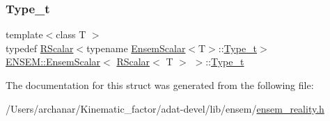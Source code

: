 \subsubsection{\texorpdfstring{Type\_t}{Type\_t}\hspace{0.1cm}{\footnotesize\ttfamily [3/3]}}
{\footnotesize\ttfamily template$<$class T $>$ \\
typedef \mbox{\hyperlink{classENSEM_1_1RScalar}{R\+Scalar}}$<$typename \mbox{\hyperlink{structENSEM_1_1EnsemScalar}{Ensem\+Scalar}}$<$T$>$\+::\mbox{\hyperlink{structENSEM_1_1EnsemScalar_3_01RScalar_3_01T_01_4_01_4_a153cd6d2b242e40d3614a2801d091aad}{Type\+\_\+t}}$>$ \mbox{\hyperlink{structENSEM_1_1EnsemScalar}{E\+N\+S\+E\+M\+::\+Ensem\+Scalar}}$<$ \mbox{\hyperlink{classENSEM_1_1RScalar}{R\+Scalar}}$<$ T $>$ $>$\+::\mbox{\hyperlink{structENSEM_1_1EnsemScalar_3_01RScalar_3_01T_01_4_01_4_a153cd6d2b242e40d3614a2801d091aad}{Type\+\_\+t}}}



The documentation for this struct was generated from the following file\+:\begin{DoxyCompactItemize}
\item 
/\+Users/archanar/\+Kinematic\+\_\+factor/adat-\/devel/lib/ensem/\mbox{\hyperlink{adat-devel_2lib_2ensem_2ensem__reality_8h}{ensem\+\_\+reality.\+h}}\end{DoxyCompactItemize}
